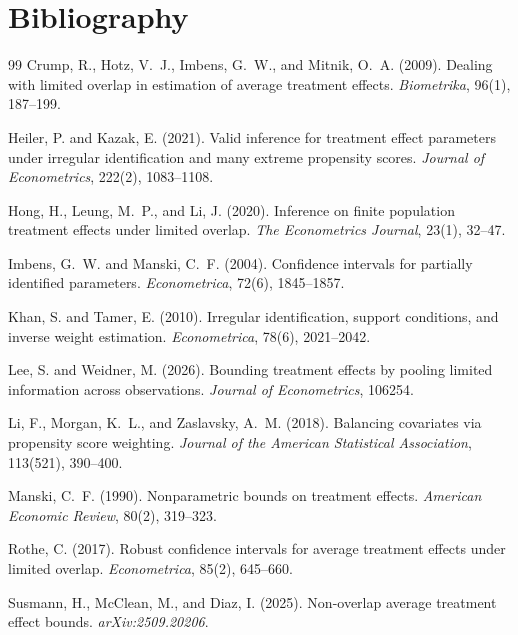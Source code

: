 \documentclass[11pt]{article}
\theoremstyle{definition}
\theoremstyle{plain}
\theoremstyle{remark}
\begin{document}
\section*{Bibliography}
\begin{thebibliography}{99}
Crump, R., Hotz, V.~J., Imbens, G.~W., and Mitnik, O.~A. (2009).
Dealing with limited overlap in estimation of average treatment effects.
\emph{Biometrika}, 96(1), 187--199.

Heiler, P. and Kazak, E. (2021).
Valid inference for treatment effect parameters under irregular identification and many extreme propensity scores.
\emph{Journal of Econometrics}, 222(2), 1083--1108.

Hong, H., Leung, M.~P., and Li, J. (2020).
Inference on finite population treatment effects under limited overlap.
\emph{The Econometrics Journal}, 23(1), 32--47.

Imbens, G.~W. and Manski, C.~F. (2004).
Confidence intervals for partially identified parameters.
\emph{Econometrica}, 72(6), 1845--1857.

Khan, S. and Tamer, E. (2010).
Irregular identification, support conditions, and inverse weight estimation.
\emph{Econometrica}, 78(6), 2021--2042.

Lee, S. and Weidner, M. (2026).
Bounding treatment effects by pooling limited information across observations.
\emph{Journal of Econometrics}, 106254.

Li, F., Morgan, K.~L., and Zaslavsky, A.~M. (2018).
Balancing covariates via propensity score weighting.
\emph{Journal of the American Statistical Association}, 113(521), 390--400.

Manski, C.~F. (1990).
Nonparametric bounds on treatment effects.
\emph{American Economic Review}, 80(2), 319--323.

Rothe, C. (2017).
Robust confidence intervals for average treatment effects under limited overlap.
\emph{Econometrica}, 85(2), 645--660.

Susmann, H., McClean, M., and Diaz, I. (2025).
Non-overlap average treatment effect bounds.
\emph{arXiv:2509.20206}.
\end{thebibliography}
\end{document}
